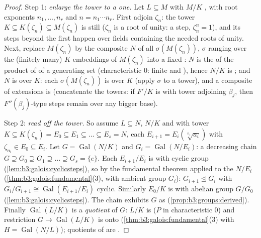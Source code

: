 \begin{proof}
Step 1: \emph{enlarge the  tower to a  one.} Let $L
\subseteq M$ with $M/K$ , with root exponents $n_1, \dots,
n_r$ and $n = n_1\cdots n_r$. First adjoin $\zeta_n$: the tower
$K \subseteq K(\zeta_n) \subseteq M(\zeta_n)$ is still 
($\zeta_n$ is a root of unity: a  step, $\zeta_n^n = 1$),
and its steps beyond the first happen over fields containing the
needed roots of unity. Next, replace $M(\zeta_n)$ by the
composite $N$ of all $\sigma(M(\zeta_n))$, $\sigma$ ranging over
the (finitely many) $K$-embeddings of $M(\zeta_n)$ into a fixed
: $N$ is the  of the product of
 of a generating set (characteristic $0$:
finite and ), hence $N/K$ is ; and $N$ is
 over $K$: each $\sigma(M(\zeta_n))$ is  over $K$
(apply $\sigma$ to a  tower), and a composite of 
extensions is  (concatenate the towers: if $F'/K$ is
 with tower adjoining $\beta_j$, then $F''(\beta_j)$-type
steps remain  over any bigger base).

Step 2: \emph{read  off the  tower.} So assume
$L \subseteq N$, $N/K$  and  with tower $K
\subseteq K(\zeta_n) = E_0 \subseteq E_1 \subseteq \dots
\subseteq E_s = N$, each $E_{i+1} = E_i(\sqrt[n_i]{a_i})$ with
$\zeta_{n_i} \in E_0 \subseteq E_i$. Let $G =
\operatorname{Gal}(N/K)$ and $G_i = \operatorname{Gal}(N/E_i)$:
a decreasing chain $G \supseteq G_0 \supseteq G_1 \supseteq
\dots \supseteq G_s = \{e\}$. Each $E_{i+1}/E_i$ is  with
cyclic group (\cref{lem:b3:galois:cyclicsteps}), so by the
fundamental theorem applied to the  $N/E_i$
(\cref{thm:b3:galois:fundamental}(3), with ambient group $G_i$):
$G_{i+1} \trianglelefteq G_i$ with $G_i/G_{i+1} \cong
\operatorname{Gal}(E_{i+1}/E_i)$ cyclic. Similarly $E_0/K$ is
 with abelian group $G/G_0$
(\cref{lem:b3:galois:cyclicsteps}). The chain exhibits $G$ as
 (\cref{prop:b3:groups:derived}). Finally
$\operatorname{Gal}(L/K)$ is a \emph{quotient} of $G$: $L/K$ is
 ($P$  in characteristic $0$) and restriction $G
\to \operatorname{Gal}(L/K)$ is onto
(\cref{thm:b3:galois:fundamental}(3) with $H =
\operatorname{Gal}(N/L)$); quotients of  are
.
\end{proof}

